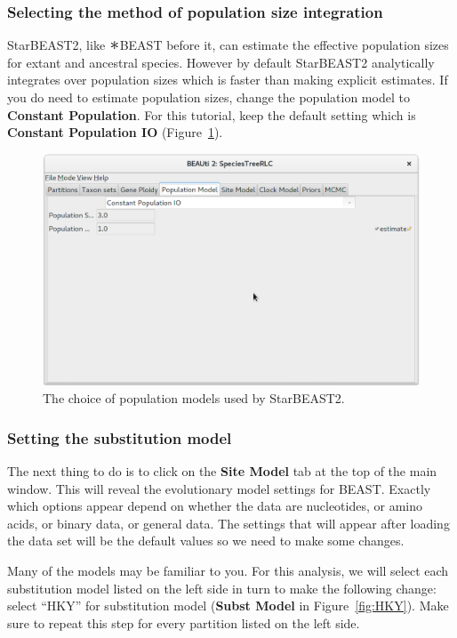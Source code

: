 \documentclass{article}
\newcommand{\Conv}{\mathop{\scalebox{1.5}{$\ast$}}}
\begin{document}
\subsubsection*{Selecting the method of population size integration}

StarBEAST2, like $\Conv$BEAST before it, can estimate the effective population
sizes for extant and ancestral species. However by default StarBEAST2 analytically
integrates over population sizes which is faster than making explicit estimates.
If you do need to estimate population sizes, change the population model to
\textbf{Constant Population}. For this tutorial, keep the default setting which
is \textbf{Constant Population IO} (Figure~\ref{fig:pop}).

\begin{figure}[htb!]
\centering
\includegraphics[width=\textwidth]{figures/beauti-pop.png}
\caption{The choice of population models used by StarBEAST2.}
\label{fig:pop}
\end{figure}

\subsubsection*{Setting the substitution model}

The next thing to do is to click on the \textbf{Site Model} tab at the top of
the main window. This will reveal the evolutionary model settings for BEAST.
Exactly which options appear depend on whether the data are nucleotides, or
amino acids, or binary data, or general data. The settings that will appear
after loading the data set will be the default values so we need to make some
changes.

Many of the models may be familiar to you. For this analysis, we will select
each substitution model listed on the left side in turn to make the following
change: select ``HKY'' for substitution model (\textbf{Subst Model} in
Figure~\ref{fig:HKY}). Make sure to repeat this step for every partition listed
on the left side.
\end{document}
